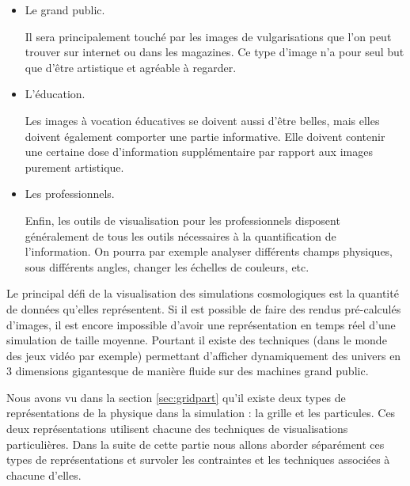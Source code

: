 \begin{itemize}
\item Le grand public. 
 
Il sera principalement touché par les images de vulgarisations que l'on peut trouver sur internet ou dans les magazines.
Ce type d'image n'a pour seul but que d'être artistique et agréable à regarder.

\item L'éducation.

Les images à vocation éducatives se doivent aussi d'être belles, mais elles doivent également comporter une partie informative.
Elle doivent contenir une certaine dose d'information supplémentaire par rapport aux images purement artistique.

\item Les professionnels.

Enfin, les outils de visualisation pour les professionnels disposent généralement de tous les outils nécessaires à la quantification de l'information.
On pourra par exemple analyser différents champs physiques, sous différents angles, changer les échelles de couleurs, etc.
\end{itemize}





Le principal défi de la visualisation des simulations cosmologiques est la quantité de données qu'elles représentent.
Si il est possible de faire des rendus pré-calculés d'images, il est encore impossible d'avoir une représentation en temps réel d'une simulation de taille moyenne.
Pourtant il existe des techniques (dans le monde des jeux vidéo par exemple) permettant d'afficher dynamiquement des univers en 3 dimensions gigantesque de manière fluide sur des machines grand public.

Nous avons vu dans la section \ref{sec:gridpart} qu'il existe deux types de représentations de la physique dans la simulation : la grille et les particules.
Ces deux représentations utilisent chacune des techniques de visualisations particulières.
Dans la suite de cette partie nous allons aborder séparément ces types de représentations et survoler les contraintes et les techniques associées à chacune d'elles.


